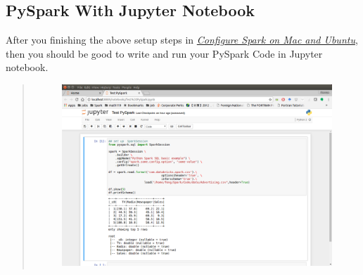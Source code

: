 \documentclass[letterpaper,11pt,english]{sphinxmanual}
\begin{document}
\subsection{PySpark With Jupyter Notebook}
\label{setup:pyspark-with-jupyter-notebook}
After you finishing the above setup steps in {\hyperref[setup:set-up-ubuntu]{\emph{Configure Spark on Mac and Ubuntu}}},
then you should be good to write and run your PySpark Code
in Jupyter notebook.
\begin{quote}
\begin{figure}[htbp]
\centering

\includegraphics{jupyterWithPySpark.png}
\label{setup:fig-jupyterwithpyspark}\end{figure}
\end{quote}
\end{document}
